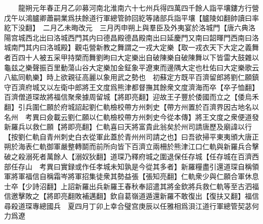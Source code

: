 　　龍朔元年春正月乙卯募河南北淮南六十七州兵得四萬四千餘人詣平壤鏤方行營戊午以鴻臚卿蕭嗣業爲扶餘道行軍總管帥回紇等諸部兵詣平壤【臚陵如翻帥讀曰率紇下没翻】　二月乙未晦改元　三月丙申朔上與羣臣及外夷宴於洛城門【唐六典洛陽宫城西北出曰洛城西門其内曰德昌殿德昌殿南出曰延慶門又南曰韶暉門西南曰洛城南門其内曰洛城殿】觀屯營新教之舞謂之一戎大定樂【取一戎衣天下大定之義舞者百四十人被五采甲持槊而舞劉昫曰大定樂出自破陳樂自破陳舞以下皆雷大鼓雜以龜兹之樂聲振百里動蕩山谷大定樂加金鉦象平遼東而邊隅大定也杜佑曰大定樂歌云八紘同軌樂】時上欲親征高麗以象用武之勢也　初蘇定方既平百濟留郎將劉仁願鎮守百濟府城又以左衛中郎將王文度爲熊津都督撫其餘衆文度濟海而卒【卒子恤翻】百濟僧道琛故將福信聚衆據周留城【將即亮翻】迎故王子豐於倭國而立之【倭烏禾翻】引兵圍仁願於府城詔起劉仁軌檢校帶方州刺史【帶方州置於百濟界因古地名以名州　考異曰僉載云劉仁願以仁軌檢校帶方州刺史今從本傳】將王文度之衆便道發新羅兵以救仁願【將即亮翻】仁軌喜曰天將富貴此翁矣於州司請唐歷及廟諱以行【按劉仁軌自青州刺史白衣從軍此蓋於青州州司請之也】曰吾欲掃平東夷頒大唐正朔於海表仁軌御軍嚴整轉鬬而前所向皆下百濟立兩柵於熊津江口仁軌與新羅兵合擊破之殺溺死者萬餘人【溺奴狄翻】道琛乃釋府城之圍退保任存城【任存城在百濟西部任存山　考異曰實録或作任孝城未知孰是今從其多者】新羅糧盡引還道琛自稱領軍將軍福信自稱霜岑將軍招集徒衆其勢益張【張知亮翻】仁軌衆少與仁願合軍休息士卒【少詩沼翻】上詔新羅出兵新羅王春秋奉詔遣其將金欽將兵救仁軌等至古泗福信邀擊敗之【將即亮翻敗補邁翻】欽自葛嶺道遁還新羅不敢復出【復扶又翻】福信尋殺道琛專總國兵　夏四月丁卯上幸合璧宫庚辰以任雅相爲浿江道行軍總管契苾何力爲遼

